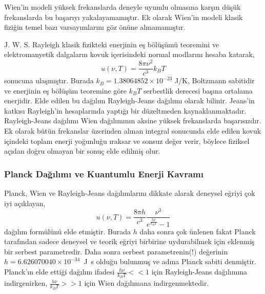 \documentclass[00_kitap.tex]{subfiles}
\begin{document}
Wien'in modeli yüksek frekanslarda deneyle uyumlu olmasına karşın düşük frekanslarda bu başarıyı yakalayamamıştır. Ek olarak Wien'in modeli klasik fiziğin temel bazı varsayımlarını göz önüne almamamıştır. 

J. W. S. Rayleigh klasik fizikteki enerjinin eş bölüşümü teoremini ve elektromanyetik dalgaların kovuk içerisindeki normal modlarını hesaba katarak,
%
\begin{equation}
\label{eq:Rayleigh}
u(\nu, T) = \frac{8 \pi \nu^{2}}{c^{3}} k_{B} T
\end{equation}
sonucuna ulaşmıştır. Burada $k_B = 1.38064852 \times 10^{-23}$ J/K, Boltzmann sabitidir ve enerjinin eş bölüşüm teoremine göre $k_B T$ serbestlik derecesi başına ortalama enerjidir. Elde edilen bu dağılım Rayleigh-Jeans dağılımı olarak bilinir. Jeans'in katkısı Rayleigh'in hesaplarında yaptığı bir düzeltmeden kaynaklanmaktadır. Rayleigh-Jeans dağılımı Wien dağılımının aksine yüksek frekanslarda başarısızdır. Ek olarak bütün frekanslar üzerinden alınan integral sonucunda elde edilen kovuk içindeki toplam enerji yoğunluğu ıraksar ve sonsuz değer verir, böylece fiziksel açıdan doğru olmayan bir sonuç elde edilmiş olur.






\subsubsection{Planck Dağılımı ve Kuantumlu Enerji Kavramı}

Planck, Wien ve Rayleigh-Jeans dağılımlarını dikkate alarak deneysel eğriyi çok iyi açıklayan,
\begin{equation}
\label{eq:Planck}
u(\nu, T) = \frac{8 \pi h}{c^{3}} \frac{\nu^{3}}{e^{\frac{h \nu}{k_{B} T}} - 1}
\end{equation} 
dağılım formülünü elde etmiştir. Burada $h$ daha sonra çok ünlenen fakat Planck tarafından sadece deneysel ve teorik eğriyi birbirine uydurabilmek için eklenmiş bir serbest parametredir. Daha sonra serbest parametrenin(!) değerinin $h=6.626070040 \times 10^{-34}$~J~s olduğu bulunmuş ve adına Planck sabiti denmiştir. Planck'ın elde ettiği dağılım ifadesi $\frac{h\nu}{k_B T}<<1$ için Rayleigh-Jeans dağılımına indirgenirken, $\frac{h\nu}{k_B T}>>1$ için Wien dağılımana indirgenmektedir.
\end{document}
